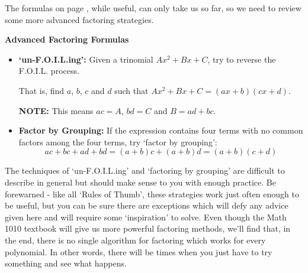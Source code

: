 \documentclass[11pt]{article}
\theoremstyle{definition}  %
\newcommand{\bbm}{\begin{boxedminipage}{6.41in}}
\newcommand{\ebm}{\end{boxedminipage}}
\begin{document}
The formulas on page \pageref{CommonFactoringFormulas}, while useful, can only take us so far, so we need to review some more advanced factoring strategies. 

\medskip

\label{AdvancedReviewFactoring}

\colorbox{ResultColor}{\bbm
\centerline{\textbf{Advanced Factoring Formulas}}

\begin{itemize}

\item  \textbf{`un-F.O.I.L.ing':} Given a trinomial $Ax^2 + Bx + C$, try to reverse the F.O.I.L. process.  

That is, find  $a$, $b$, $c$ and $d$ such that $Ax^2 + Bx + C= (ax+b)(cx+d)$.  

\textbf{NOTE:}  This means $ac = A$, $bd = C$ and $B = ad+bc$.

\item \textbf{Factor by Grouping:} If the expression contains four terms with no common factors among the four terms, try `factor by grouping': \[ac + bc + ad + bd = (a +b)c + (a+b)d = (a+b)(c+d)\]

\end{itemize}

\ebm}

\medskip

The techniques of `un-F.O.I.L.ing' and `factoring by grouping' are difficult to describe in general but should make sense to you with enough practice.  Be forewarned - like all `Rules of Thumb', these strategies work just often enough to be useful, but you can be sure there are exceptions which will defy any advice given here and will require some `inspiration' to solve. Even though the Math 1010 textbook will give us more powerful factoring methods, we'll find that, in the end, there is no single algorithm for factoring which works for every polynomial. In other words, there will be times when you just have to try something and see what happens.
\end{document}
